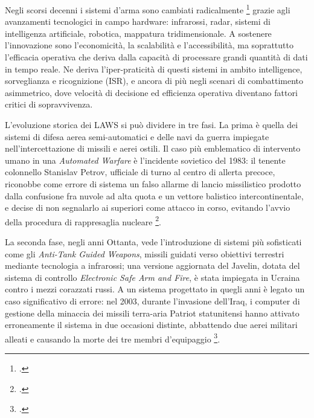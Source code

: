 \ifstampa\documentclass[a4paper,12pt,twoside,openright]{report}\else\documentclass[a4paper,12pt]{report}\fi
\newif\ifrevisione \revisionefalse
\DeclareRobustCommand{\rev}[1]{\ifrevisione{\color{blue!65!black}#1}\else#1\fi}
\begin{document}
Negli scorsi decenni i sistemi d'arma sono cambiati radicalmente
\footcite{longpre_2022} grazie agli avanzamenti tecnologici in campo hardware:
infrarossi, radar, sistemi di intelligenza artificiale, robotica, mappatura
tridimensionale. A sostenere l'innovazione sono l'economicità, la scalabilità e
l'accessibilità, ma soprattutto l'efficacia operativa che deriva dalla capacità
di processare grandi quantità di dati in tempo reale. Ne deriva l'iper-praticità
di questi sistemi in ambito intelligence, sorveglianza e ricognizione (ISR), e
ancora di più negli scenari di combattimento asimmetrico, dove velocità di
decisione ed efficienza operativa diventano fattori critici di sopravvivenza.
 
L'evoluzione storica dei LAWS si può dividere in tre fasi. La prima è quella dei
sistemi di difesa aerea semi-automatici e delle navi da guerra impiegate
nell'intercettazione di missili e aerei ostili. Il caso più emblematico di
intervento umano in una \textit{Automated Warfare} è l'incidente sovietico del
1983: il \rev{tenente colonnello Stanislav Petrov, ufficiale di turno al centro di allerta precoce,}
riconobbe come errore di sistema un falso allarme di lancio missilistico
prodotto dalla confusione fra nuvole ad alta quota e un vettore balistico
intercontinentale, e \rev{decise di non segnalarlo ai superiori come attacco in corso, evitando l'avvio della procedura di rappresaglia nucleare} \footcite{hoffman_1999_petrov}.
 
La seconda fase, negli anni Ottanta, vede l'introduzione di sistemi più
sofisticati come gli \textit{Anti-Tank Guided Weapons}, missili guidati verso
obiettivi terrestri mediante tecnologia a infrarossi; una versione aggiornata
del Javelin, dotata del sistema di controllo \textit{Electronic Safe Arm and
Fire}, è stata impiegata in Ucraina contro i mezzi corazzati russi. \rev{A un sistema progettato in quegli anni è legato un caso significativo di errore: nel 2003, durante l'invasione dell'Iraq,}
i computer di gestione della minaccia dei missili terra-aria Patriot statunitensi
hanno attivato erroneamente il sistema in due occasioni distinte, abbattendo due
aerei militari alleati e \rev{causando la morte dei tre membri d'equipaggio}
\footcite{horowitz_kahn_2024}.
 
\end{document}
